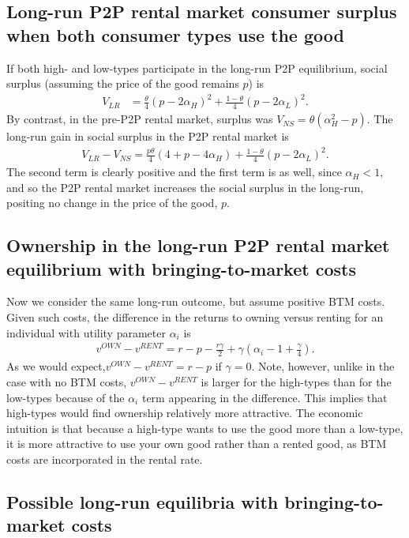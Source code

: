 \documentclass[12pt]{article}
\begin{document}
\subsection{Long-run P2P rental market consumer surplus when both consumer types use the good} 
If both high- and low-types participate in the long-run P2P equilibrium, social surplus (assuming the price of the good remains $p$) is 
\begin{align} 
V_{LR} & = \frac{\theta}{4}(p - 2\alpha_H)^2 + \frac{1-\theta}{4}(p - 2\alpha_L)^2.
\end{align} 
By contrast, in the pre-P2P rental market, surplus was $V_{NS} = \theta(\alpha_H^2 - p)$.  
The long-run gain in social surplus in the P2P rental market is  
\begin{align}
V_{LR} - V_{NS} = \frac{p\theta}{4}(4 + p - 4 \alpha_H) + \frac{1-\theta}{4}(p - 2\alpha_L)^2. 
\end{align}
The second term is clearly positive and the first term is as well, since $\alpha_H < 1$, and so the P2P rental market increases the social surplus in the long-run, positing no change in the price of the good, $p$. 

\subsection{Ownership in the long-run P2P rental market equilibrium with bringing-to-market costs}
Now we consider the same long-run outcome, but assume positive BTM costs.
Given such costs, the difference in the returns to owning versus renting for an individual with utility parameter $\alpha_i$  is 
\begin{align}
  v^{OWN} - v^{RENT} = r - p - \frac{r\gamma}{2} + \gamma \left(\alpha_i - 1 + \frac{\gamma}{4} \right). 
\end{align}
As we would expect,$v^{OWN} - v^{RENT} = r - p$ if $\gamma = 0$. 
Note, however, unlike in the case with no BTM costs, $v^{OWN} - v^{RENT}$ is larger for the high-types than for the low-types because of the $\alpha_i$ term appearing in the difference.
This implies that high-types would find ownership relatively more attractive.
The economic intuition is that because a high-type wants to use the good more than a low-type, it is more attractive to use your own good rather than a rented good, as BTM costs are incorporated in the rental rate. 

\subsection{Possible long-run equilibria with bringing-to-market costs} 
\end{document}
